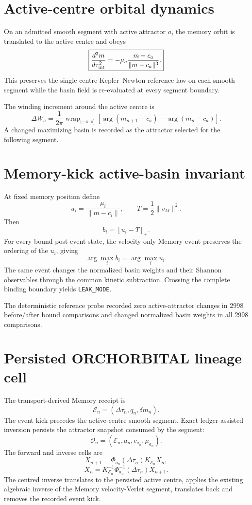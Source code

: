 \section{Active-centre orbital dynamics}

On an admitted smooth segment with active attractor \(a\), the memory orbit is translated to the active centre and obeys
\[
\boxed{
\frac{d^2m}{d\tau_{\rm int}^2}
=-\mu_a\frac{m-c_a}{\|m-c_a\|^3}.
}
\]
This preserves the single-centre Kepler--Newton reference law on each smooth segment while the basin field is re-evaluated at every segment boundary.

The winding increment around the active centre is
\[
\boxed{
\Delta W_a
=\frac{1}{2\pi}
\operatorname{wrap}_{(-\pi,\pi]}
\left[
\arg(m_{n+1}-c_a)-\arg(m_n-c_a)
\right].
}
\]
A changed maximizing basin is recorded as the attractor selected for the following segment.

\section{Memory-kick active-basin invariant}

At fixed memory position define
\[
u_i=\frac{\mu_i}{\|m-c_i\|},
\qquad
T=\frac12\|v_M\|^2.
\]
Then
\[
\boxed{b_i=[u_i-T]_+.}
\]
For every bound post-event state, the velocity-only Memory event preserves the ordering of the \(u_i\), giving
\[
\boxed{
\arg\max_i b_i=\arg\max_i u_i.
}
\]
The same event changes the normalized basin weights and their Shannon observables through the common kinetic subtraction. Crossing the complete binding boundary yields \texttt{LEAK\_MODE}.

The deterministic reference probe recorded zero active-attractor changes in 2998 before/after bound comparisons and changed normalized basin weights in all 2998 comparisons.

\section{Persisted ORCHORBITAL lineage cell}

The transport-derived Memory receipt is
\[
\mathcal E_n=(\Delta\tau_n,q_n,\delta m_n).
\]
The event kick precedes the active-centre smooth segment. Exact ledger-assisted inversion persists the attractor snapshot consumed by the segment:
\[
\boxed{
\mathcal O_n=(\mathcal E_n,a_n,c_{a_n},\mu_{a_n}).
}
\]
The forward and inverse cells are
\[
\boxed{
X_{n+1}=\Phi_{a_n}(\Delta\tau_n)K_{\mathcal E_n}X_n,
}
\]
\[
\boxed{
X_n=K_{\mathcal E_n}^{-1}\Phi_{a_n}^{-1}(\Delta\tau_n)X_{n+1}.
}
\]
The centred inverse translates to the persisted active centre, applies the existing algebraic inverse of the Memory velocity-Verlet segment, translates back and removes the recorded event kick.

